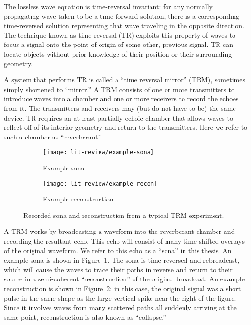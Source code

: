 The lossless wave equation is time-reversal invariant: for any normally propagating wave taken to be a time-forward solution, there is a corresponding time-reversed solution representing that wave traveling in the opposite direction. The technique known as time reversal (TR) exploits this property of waves to focus a signal onto the point of origin of some other, previous signal. TR can locate objects without prior knowledge of their position or their surrounding geometry.

A system that performs TR is called a ``time reversal mirror'' (TRM), sometimes simply shortened to ``mirror.'' A TRM consists of one or more transmitters to introduce waves into a chamber and one or more receivers to record the echoes from it. The transmitters and receivers may (but do not have to be) the same device. TR requires an at least partially echoic chamber that allows waves to reflect off of its interior geometry and return to the transmitters. Here we refer to such a chamber as ``reverberant''.

\begin{figure}
    \centering
    \begin{subfigure}{.85\textwidth}
        \centering
        \texttt{[image: lit-review/example-sona]}
        \caption[Example sona]{Example sona}
         \label{fig:lit-review-example-sona}
    \end{subfigure}
		\par\bigskip
    \begin{subfigure}{.85\textwidth}
        \centering
        \texttt{[image: lit-review/example-recon]}
        \caption[Example reconstruction]{Example reconstruction}
         \label{fig:lit-review-example-recon}
    \end{subfigure}
    \caption{Recorded sona and reconstruction from a typical TRM experiment.}
    \label{fig:lit-review-example}
\end{figure}

A TRM works by broadcasting a waveform into the reverberant chamber and recording the resultant echo. This echo will consist of many time-shifted overlays of the original waveform. We refer to this echo as a ``sona'' in this thesis. An example sona is shown in Figure~\ref{fig:lit-review-example-sona}. The sona is time reversed and rebroadcast, which will cause the waves to trace their paths in reverse and return to their source in a semi-coherent ``reconstruction'' of the original broadcast. An example reconstruction is shown in Figure~\ref{fig:lit-review-example-recon}: in this case, the original signal was a short pulse in the same shape as the large vertical spike near the right of the figure. Since it involves waves from many scattered paths all suddenly arriving at the same point, reconstruction is also known as ``collapse.''

